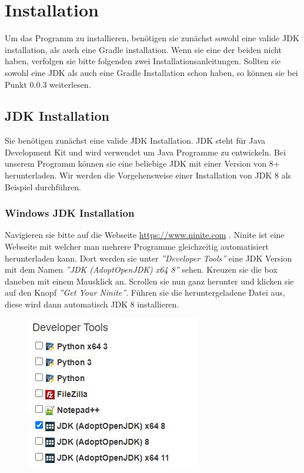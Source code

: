 \documentclass[fontsize=12pt,paper=a4,twoside]{scrartcl}
\begin{document}
\tableofcontents

\newpage


\section{Installation}

Um das Programm zu installieren, benötigen sie zunächst sowohl eine valide JDK 
installation, als auch eine Gradle installation. Wenn sie eine der beiden nicht haben, 
verfolgen sie bitte folgenden zwei Installationsanleitungen. Sollten sie sowohl eine JDK 
als auch eine Gradle Installation schon haben, so können sie bei Punkt 0.0.3 
weiterlesen.

\subsection{JDK Installation}

Sie benötigen zunächst eine valide JDK Installation. JDK steht für Java Development Kit und wird verwendet um Java Programme zu entwickeln.
Bei unserem Programm können sie eine beliebige JDK mit einer Version von 8+ herunterladen. Wir werden die Vorgehensweise einer Installation von JDK  8 als Beispiel durchführen.

\subsubsection{Windows JDK Installation}

Navigieren sie bitte auf die Webseite \url{https://www.ninite.com} . Ninite ist eine Webseite mit welcher man mehrere Programme gleichzeitig automatisiert herunterladen kann. Dort werden sie unter \textit{''Developer Tools''} eine JDK Version mit dem Namen \textit{''JDK (AdoptOpenJDK) x64 8''} sehen. Kreuzen sie die box daneben mit einem Mausklick an. Scrollen sie nun ganz herunter und klicken sie auf den Knopf \textit{''Get Your Ninite''}. Führen sie die heruntergeladene Datei aus, diese wird dann automatisch JDK 8 installieren.

\begin{figure}[h!]
\centering
\includegraphics[width=0.5\linewidth]{Windows.JPG}
\end{figure}
\end{document}
